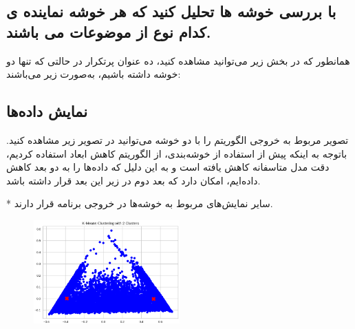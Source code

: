 \documentclass{article}
\begin{document}
\subsection{با بررسی خوشه ها تحلیل کنید که هر خوشه نماینده ی کدام نوع از موضوعات می باشند.}
همانطور که در بخش زیر می‌توانید مشاهده کنید، ده عنوان پرتکرار در حالتی که تنها دو خوشه داشته باشیم، به‌صورت زیر می‌باشند:
\lr{}

\subsection{نمایش داده‌ها}
تصویر مربوط به خروجی الگوریتم  را با دو خوشه می‌توانید در تصویر زیر مشاهده کنید.
باتوجه به اینکه پیش از استفاده از خوشه‌بندی، از الگوریتم کاهش ابعاد استفاده کردیم، دقت مدل متاسفانه کاهش یافته است و به این دلیل که داده‌ها را به دو بعد کاهش داده‌ایم، امکان دارد که بعد دوم در زیر این بعد قرار داشته باشد.

* سایر نمایش‌های مربوط به خوشه‌ها در خروجی برنامه قرار دارند.
\begin{figure}[ht]
        \centering
        \includegraphics[width=0.5\textwidth]{eval-vis.png}
        \caption{}
        \label{fig:fig9}
\end{figure}
\end{document}
